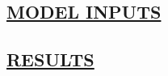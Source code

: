 \begin{kasten}
    \section*{ \hspace{0.1cm} {\color{red} \underline{MODEL INPUTS}}}
    \large{
    
    }
\end{kasten}

\begin{kasten}
    \section*{ \hspace{0.1cm} {\color{red} \underline{RESULTS}}}
    \tiny
    
    \vspace{-.5em}
\end{kasten}

